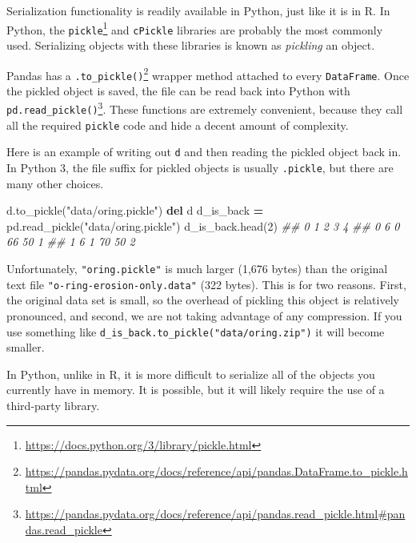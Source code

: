 \documentclass[12pt,krantz2]{krantz}
\makeatletter
\newenvironment{Shaded}{\begin{snugshade}}{\end{snugshade}}
\newcommand{\CommentTok}[1]{\textcolor[rgb]{0.37,0.37,0.37}{\textit{#1}}}
\newcommand{\DecValTok}[1]{\textcolor[rgb]{0.06,0.06,0.06}{#1}}
\newcommand{\KeywordTok}[1]{\textcolor[rgb]{0.27,0.27,0.27}{\textbf{#1}}}
\newcommand{\NormalTok}[1]{#1}
\newcommand{\OperatorTok}[1]{\textcolor[rgb]{0.43,0.43,0.43}{\textbf{#1}}}
\newcommand{\StringTok}[1]{\textcolor[rgb]{0.5,0.5,0.5}{#1}}
\renewcommand{\href}[2]{#2\footnote{\url{#1}}}
\newenvironment{kframe}{%
\medskip{}
\setlength{\fboxsep}{.8em}
 \def\at@end@of@kframe{}%
 \ifinner\ifhmode%
  \def\at@end@of@kframe{\end{minipage}}%
  \begin{minipage}{\columnwidth}%
 \fi\fi%
 \def\FrameCommand##1{\hskip\@totalleftmargin \hskip-\fboxsep
 \colorbox{shadecolor}{##1}\hskip-\fboxsep
     \hskip-\linewidth \hskip-\@totalleftmargin \hskip\columnwidth}%
 \MakeFramed {\advance\hsize-\width
   \@totalleftmargin\z@ \linewidth\hsize
   \@setminipage}}%
 {\par\unskip\endMakeFramed%
 \at@end@of@kframe}
\renewenvironment{Shaded}{\begin{kframe}}{\end{kframe}}
\makeatother
\begin{document}
Serialization functionality is readily available in Python, just like it is in R. In Python, the \href{https://docs.python.org/3/library/pickle.html}{\texttt{pickle}} and \texttt{cPickle} libraries are probably the most commonly used. Serializing objects with these libraries is known as \emph{pickling} an object.

Pandas has a \href{https://pandas.pydata.org/docs/reference/api/pandas.DataFrame.to_pickle.html}{\texttt{.to\_pickle()}} wrapper method attached to every \texttt{DataFrame}. Once the pickled object is saved, the file can be read back into Python with \href{https://pandas.pydata.org/docs/reference/api/pandas.read_pickle.html\#pandas.read_pickle}{\texttt{pd.read\_pickle()}}. These functions are extremely convenient, because they call all the required \texttt{pickle} code and hide a decent amount of complexity.

Here is an example of writing out \texttt{d} and then reading the pickled object back in. In Python 3, the file suffix for pickled objects is usually \texttt{.pickle}, but there are many other choices.

\begin{Shaded}
\begin{Highlighting}[]
\NormalTok{d.to_pickle(}\StringTok{"data/oring.pickle"}\NormalTok{)}
\KeywordTok{del}\NormalTok{ d}
\NormalTok{d_is_back }\OperatorTok{=}\NormalTok{ pd.read_pickle(}\StringTok{"data/oring.pickle"}\NormalTok{)}
\NormalTok{d_is_back.head(}\DecValTok{2}\NormalTok{)}
\CommentTok{##    0  1   2   3  4}
\CommentTok{## 0  6  0  66  50  1}
\CommentTok{## 1  6  1  70  50  2}
\end{Highlighting}
\end{Shaded}

\begin{rmd-caution}
Unfortunately, \texttt{"oring.pickle"} is much larger (1,676 bytes) than the original text file \texttt{"o-ring-erosion-only.data"} (322 bytes). This is for two reasons. First, the original data set is small, so the overhead of pickling this object is relatively pronounced, and second, we are not taking advantage of any compression. If you use something like \texttt{d\_is\_back.to\_pickle("data/oring.zip")} it will become smaller.

\end{rmd-caution}

In Python, unlike in R, it is more difficult to serialize all of the objects you currently have in memory. It is possible, but it will likely require the use of a third-party library.
\end{document}
